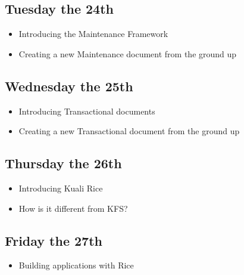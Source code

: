 \documentclass[12pt,notitlepage]{article}
\begin{document}
\begin{s5presentation}
\begin{s5slide}
\begin{ifhtml}
        \end{ifhtml} 
    \W \end{s5slide}
    \W \begin{s5slide}
        \W \section{Tuesday the 24th}
        \begin{ifhtml}
            \begin{itemize}
                \item Introducing the Maintenance Framework
                \item Creating a new Maintenance document from the ground up
            \end{itemize}
        \end{ifhtml} 
    \W \end{s5slide}
    \W \end{s5presentation}
    \W \begin{s5slide}
      \W \section{Wednesday the 25th}
      \begin{ifhtml}
           \begin{itemize}
               \item Introducing Transactional documents
               \item Creating a new Transactional document from the ground up 
           \end{itemize}
      \end{ifhtml} 
    \W \end{s5slide}
    \W \begin{s5slide}
        \W \section{Thursday the 26th}
        \begin{ifhtml}
            \begin{itemize}
                \item Introducing Kuali Rice
                \item How is it different from KFS?  
            \end{itemize}
        \end{ifhtml} 
    \W \end{s5slide}
    \W \begin{s5slide}
        \W \section{Friday the 27th}
        \begin{ifhtml}
            \begin{itemize}
                \item Building applications with Rice
            \end{itemize}
        \end{ifhtml} 
    \W \end{s5slide}
\end{document}
